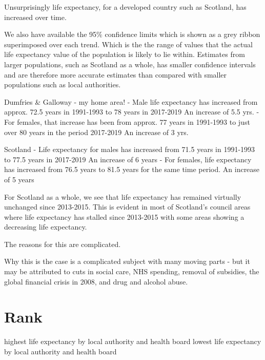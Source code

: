 \documentclass[
]{article}
\begin{document}
Unsurprisingly life expectancy, for a developed country such as
Scotland, has increased over time.

We also have available the 95\% confidence limits which is shown as a
grey ribbon superimposed over each trend. Which is the the range of
values that the actual life expectancy value of the population is likely
to lie within. Estimates from larger populations, such as Scotland as a
whole, has smaller confidence intervals and are therefore more accurate
estimates than compared with smaller populations such as local
authorities.

Dumfries \& Galloway - my home area! - Male life expectancy has
increased from approx. 72.5 years in 1991-1993 to 78 years in 2017-2019
An increase of 5.5 yrs. - For females, that increase has been from
approx. 77 years in 1991-1993 to just over 80 years in the period
2017-2019 An increase of 3 yrs.

Scotland - Life expectancy for males has increased from 71.5 years in
1991-1993 to 77.5 years in 2017-2019 An increase of 6 years - For
females, life expectancy has increased from 76.5 years to 81.5 years for
the same time period. An increase of 5 years

For Scotland as a whole, we see that life expectancy has remained
virtually unchanged since 2013-2015. This is evident in most of
Scotland's council areas where life expectancy has stalled since
2013-2015 with some areas showing a decreasing life expectancy.

The reasons for this are complicated.

Why this is the case is a complicated subject with many moving parts -
but it may be attributed to cuts in social care, NHS spending, removal
of subsidies, the global financial crisis in 2008, and drug and alcohol
abuse.

\hypertarget{rank}{%
\section{Rank}\label{rank}}

highest life expectancy by local authority and health board lowest life
expectancy by local authority and health board
\end{document}
